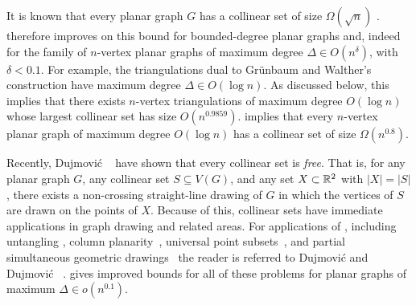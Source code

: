 \documentclass{patmorin}
\begin{document}
It is known that every planar graph $G$ has a collinear set of size
$\Omega(\sqrt{n})$ \cite{bose.dujmovic.ea:polynomial,dujmovic:utility}
.  therefore improves on this bound for bounded-degree planar
graphs and, indeed for the family of $n$-vertex planar graphs of maximum
degree $\Delta\in O(n^{\delta})$, with $\delta < 0.1$.  For example,
the triangulations dual to Gr\"unbaum and Walther's construction have
maximum degree $\Delta \in O(\log n)$.  As discussed below, this implies
that there exists $n$-vertex triangulations of maximum degree $O(\log
n)$ whose largest collinear set has size $O(n^{0.9859})$.  
implies that every $n$-vertex planar graph of maximum degree $O(\log n)$
has a collinear set of size $\Omega(n^{0.8})$.

Recently, Dujmovi\'c \etal\ \cite{dujmovic.frati.ea:every} have shown
that every collinear set is \emph{free}. That is, for any planar graph
$G$, any collinear set $S\subseteq V(G)$, and any set $X\subset\mathbb{R}^2$
with $|X|=|S|$, there exists a non-crossing straight-line drawing of $G$
in which the vertices of $S$ are drawn on the points of $X$.  Because of
this, collinear sets have immediate applications in graph drawing and
related areas.  For applications of , including untangling
\cite{cibulka:untangling,pach.tardos:untangling,watanabe:open,goaoc.kratochvil.ea:untangling,kang.pikhurko.ea:untangling,bose.dujmovic.ea:polynomial,dalozzo.dujmovic.ea:drawing,dujmovic:utility,ravsky.verbitsky:on},
column
planarity~\cite{barba.evans.ea:column,evans.kusters.ea:column,dalozzo.dujmovic.ea:drawing,dujmovic:utility},
universal point
subsets~\cite{digiacomo.liotta.ea:how,angelini.binucci.ea:universal,dalozzo.dujmovic.ea:drawing,dujmovic:utility},
and partial simultaneous geometric
drawings~\cite{evans.kusters.ea:column,barba.hoffmann.ea:column,angelini.evans.ea:sefe,blasius.kobourov.ea:simultaneous,dujmovic:utility}
the reader is referred to Dujmovi\'c \cite{dujmovic:utility}
and Dujmovi\'c \etal\ \cite[Section~1.1]{dujmovic.frati.ea:every}.
 gives improved bounds for all of these problems for planar
graphs of maximum $\Delta\in o(n^{0.1})$.
\end{document}
